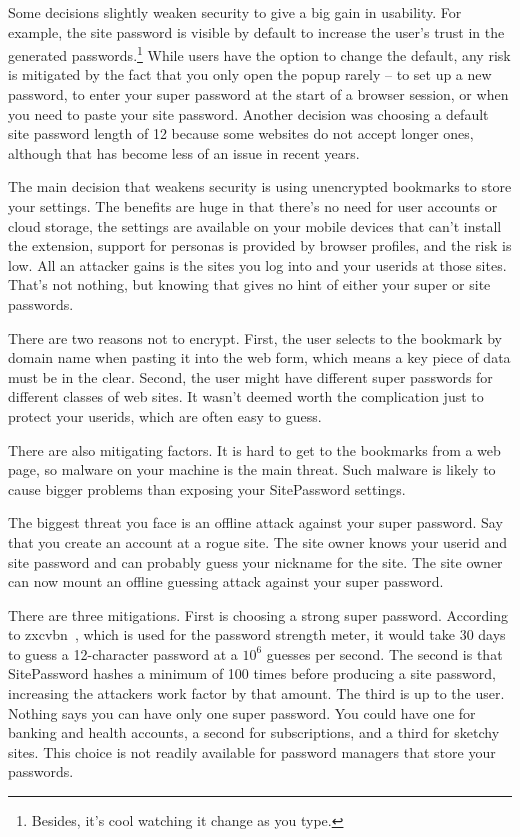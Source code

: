 Some decisions slightly weaken security to give a big gain in usability.  For example, the site password is visible by default to increase the user's trust in the generated passwords.\footnote{Besides, it's cool watching it change as you type.}  While users have the option to change the default, any risk is mitigated by the fact that you only open the popup rarely -- to set up a new password, to enter your super password at the start of a browser session, or when you need to paste your site password.  Another decision was choosing a default site password length of 12 because some websites do not accept longer ones, although that has become less of an issue in recent years. 

The main decision that weakens security is using unencrypted bookmarks to store your settings.   The benefits are huge in that there's no need for user accounts or cloud storage, the settings are available on your mobile devices that can't install the extension, support for personas is provided by browser profiles, and the risk is low.  All an attacker gains is the sites you log into and your userids at those sites.  That's not nothing, but knowing that gives no hint of either your super or site passwords.

There are two reasons not to encrypt.  First, the user selects to the bookmark by domain name when pasting it into the web form, which means a key piece of data must be in the clear.  Second, the user might have different super passwords for different classes of web sites.  It wasn't deemed worth the complication just to protect your userids, which are often easy to guess.

There are also mitigating factors.  It is hard to get to the bookmarks from a web page, so malware on your machine is the main threat.  Such malware is likely to cause bigger problems than exposing your SitePassword settings.

The biggest threat you face is an offline attack against your super password.  Say that you create an account at a rogue site.  The site owner knows your userid and site password and can probably guess your nickname for the site.  The site owner can now mount an offline guessing attack against your super password.

There are three mitigations.  First is choosing a strong super password.  According to zxcvbn~\cite{zxcvbn}, which is used for the password strength meter, it would take 30 days to guess a 12-character password at a $10^6$ guesses per second.  The second is that SitePassword hashes a minimum of 100 times before producing a site password, increasing the attackers work factor by that amount.  The third is up to the user.  Nothing says you can have only one super password.  You could have one for banking and health accounts, a second for subscriptions, and a third for sketchy sites.  This choice is not readily available for password managers that store your passwords. 

